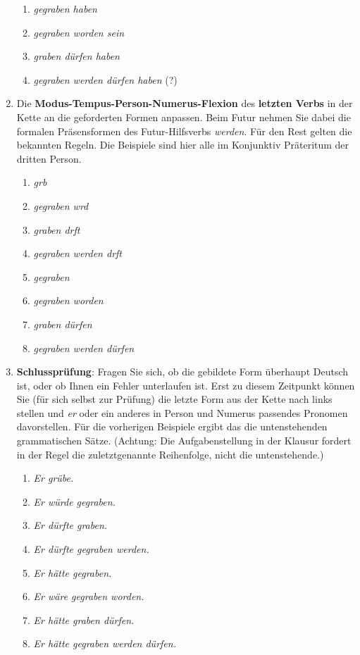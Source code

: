 \begin{enumerate}
\begin{enumerate}
      \item \textit{gegraben haben }
      \item \textit{gegraben worden sein }
      \item \textit{graben dürfen haben }
      \item \textit{gegraben werden dürfen haben } (?)
    \end{enumerate}
  \item Die \textbf{Modus-Tempus-Person-Numerus-Flexion} des \textbf{letzten Verbs} in der Kette an die geforderten Formen anpassen. Beim Futur nehmen Sie dabei die formalen Präsensformen des Futur-Hilfsverbs \textit{werden}. Für den Rest gelten die bekannten Regeln. Die Beispiele sind hier alle im Konjunktiv Präteritum der dritten Person.
    \begin{enumerate}
      \item \textit{grb}
      \item \textit{gegraben wrd}
      \item \textit{graben drft}
      \item \textit{gegraben werden drft}
      \item \textit{gegraben }
      \item \textit{gegraben worden }
      \item \textit{graben dürfen }
      \item \textit{gegraben werden dürfen }
    \end{enumerate} 
  \item \textbf{Schlussprüfung}: Fragen Sie sich, ob die gebildete Form überhaupt Deutsch ist, oder ob Ihnen ein Fehler unterlaufen ist. Erst zu diesem Zeitpunkt können Sie (für sich selbst zur Prüfung) die letzte Form aus der Kette nach links stellen und \textit{er} oder ein anderes in Person und Numerus passendes Pronomen davorstellen. Für die vorherigen Beispiele ergibt das die untenstehenden grammatischen Sätze. (Achtung: Die Aufgabenstellung in der Klausur fordert in der Regel die zuletztgenannte Reihenfolge, nicht die untenstehende.)
    \begin{enumerate}
      \item \textit{Er grübe.}
      \item \textit{Er würde gegraben.}
      \item \textit{Er dürfte graben.}
      \item \textit{Er dürfte gegraben werden.}
      \item \textit{Er hätte gegraben.}
      \item \textit{Er wäre gegraben worden.}
      \item \textit{Er hätte graben dürfen.}
      \item \textit{Er hätte gegraben werden dürfen.}
    \end{enumerate}
\end{enumerate}

